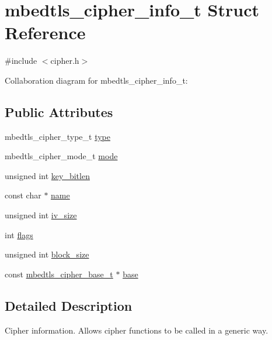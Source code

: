 \hypertarget{structmbedtls__cipher__info__t}{}\section{mbedtls\+\_\+cipher\+\_\+info\+\_\+t Struct Reference}
\label{structmbedtls__cipher__info__t}


{\ttfamily \#include $<$cipher.\+h$>$}



Collaboration diagram for mbedtls\+\_\+cipher\+\_\+info\+\_\+t\+:
\subsection*{Public Attributes}
\begin{DoxyCompactItemize}
\item 
mbedtls\+\_\+cipher\+\_\+type\+\_\+t \mbox{\hyperlink{structmbedtls__cipher__info__t_a399f289efa81ca0da63bc80686b5fe82}{type}}
\item 
mbedtls\+\_\+cipher\+\_\+mode\+\_\+t \mbox{\hyperlink{structmbedtls__cipher__info__t_a6603375900f4834ae6c91e305aef34f6}{mode}}
\item 
unsigned int \mbox{\hyperlink{structmbedtls__cipher__info__t_a21ac3fc6bf536ce16f1754301e7fe3c9}{key\+\_\+bitlen}}
\item 
const char $\ast$ \mbox{\hyperlink{structmbedtls__cipher__info__t_a7e79a9fb2bd143cc08d59b89b86c9ed7}{name}}
\item 
unsigned int \mbox{\hyperlink{structmbedtls__cipher__info__t_a3416bc1e18e1694da17bc922f152b20d}{iv\+\_\+size}}
\item 
int \mbox{\hyperlink{structmbedtls__cipher__info__t_af0aa5e7fedfd8a85434ec43691d890d8}{flags}}
\item 
unsigned int \mbox{\hyperlink{structmbedtls__cipher__info__t_a7be9560c375110a1d829407e74ab698f}{block\+\_\+size}}
\item 
const \mbox{\hyperlink{structmbedtls__cipher__base__t}{mbedtls\+\_\+cipher\+\_\+base\+\_\+t}} $\ast$ \mbox{\hyperlink{structmbedtls__cipher__info__t_ab49e136926e04b02806503deb8844f2d}{base}}
\end{DoxyCompactItemize}


\subsection{Detailed Description}
Cipher information. Allows cipher functions to be called in a generic way. 

